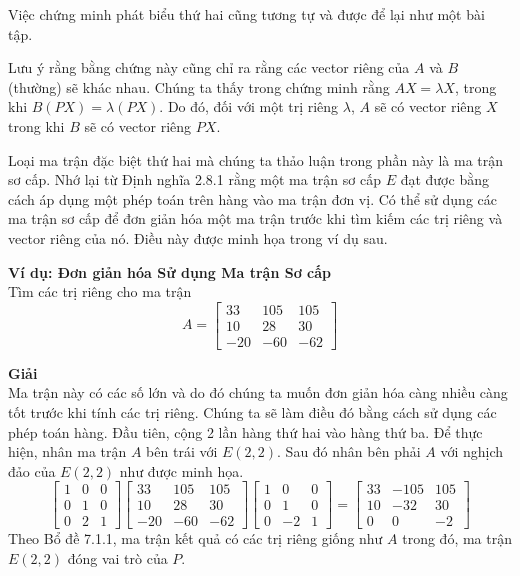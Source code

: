 Việc chứng minh phát biểu thứ hai cũng tương tự và được để lại như một bài tập.

Lưu ý rằng bằng chứng này cũng chỉ ra rằng các vector riêng của $A$ và $B$ (thường) sẽ khác nhau. Chúng ta thấy trong chứng minh rằng $AX=\lambda X$, trong khi $B(PX)=\lambda(PX)$. Do đó, đối với một trị riêng $\lambda$, $A$ sẽ có vector riêng $X$ trong khi $B$ sẽ có vector riêng $PX$.

Loại ma trận đặc biệt thứ hai mà chúng ta thảo luận trong phần này là ma trận sơ cấp. Nhớ lại từ Định nghĩa 2.8.1 rằng một ma trận sơ cấp $E$ đạt được bằng cách áp dụng một phép toán trên hàng vào ma trận đơn vị.
Có thể sử dụng các ma trận sơ cấp để đơn giản hóa một ma trận trước khi tìm kiếm các trị riêng và vector riêng của nó. Điều này được minh họa trong ví dụ sau.

\textbf{Ví dụ: Đơn giản hóa Sử dụng Ma trận Sơ cấp} \\
Tìm các trị riêng cho ma trận
\begin{equation*}
A=\begin{bmatrix}33&105&105\\ 10&28&30\\ -20&-60&-62\end{bmatrix}
\end{equation*}

\textbf{Giải} \\
Ma trận này có các số lớn và do đó chúng ta muốn đơn giản hóa càng nhiều càng tốt trước khi tính các trị riêng. Chúng ta sẽ làm điều đó bằng cách sử dụng các phép toán hàng. Đầu tiên, cộng 2 lần hàng thứ hai vào hàng thứ ba. Để thực hiện, nhân ma trận $A$ bên trái với $E(2,2)$. Sau đó nhân bên phải $A$ với nghịch đảo của $E(2,2)$ như được minh họa.
\begin{equation*}
\begin{bmatrix}1&0&0\\ 0&1&0\\ 0&2&1\end{bmatrix}\begin{bmatrix}33&105&105\\ 10&28&30\\ -20&-60&-62\end{bmatrix}\begin{bmatrix}1&0&0\\ 0&1&0\\ 0&-2&1\end{bmatrix}=\begin{bmatrix}33&-105&105\\ 10&-32&30\\ 0&0&-2\end{bmatrix}
\end{equation*}
Theo Bổ đề 7.1.1, ma trận kết quả có các trị riêng giống như $A$ trong đó, ma trận $E(2,2)$ đóng vai trò của $P$.


